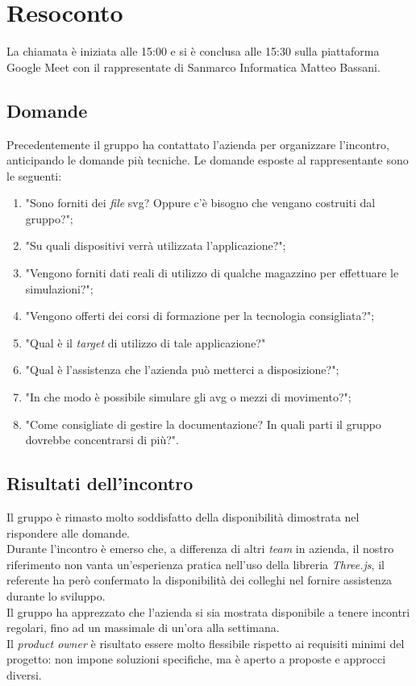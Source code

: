 \section{Resoconto}
La chiamata è iniziata alle 15:00 e si è conclusa alle 15:30 sulla piattaforma Google Meet con il rappresentate di Sanmarco Informatica Matteo Bassani.
\subsection{Domande}
Precedentemente il gruppo ha contattato l'azienda per organizzare l'incontro, anticipando le domande più tecniche.
Le domande esposte al rappresentante sono le seguenti:
\begin{enumerate}
    \item "Sono forniti dei \textit{file} svg? Oppure c'è bisogno che vengano costruiti dal gruppo?";
    \item "Su quali dispositivi verrà utilizzata l'applicazione?";
    \item "Vengono forniti dati reali di utilizzo di qualche magazzino per effettuare le simulazioni?";
    \item "Vengono offerti dei corsi di formazione per la tecnologia consigliata?";
	\item "Qual è il \textit{target} di utilizzo di tale applicazione?"
    \item "Qual è l'assistenza che l'azienda può metterci a disposizione?";
    \item "In che modo è possibile simulare gli avg o mezzi di movimento?";
    \item "Come consigliate di gestire la documentazione? In quali parti il gruppo dovrebbe concentrarsi di più?".
\end{enumerate}

\subsection{Risultati dell'incontro}
Il gruppo è rimasto molto soddisfatto della disponibilità dimostrata nel rispondere alle domande. \\ 
Durante l'incontro è emerso che, a differenza di altri \textit{team} in azienda, il nostro riferimento non vanta un'esperienza pratica nell'uso della libreria \textit{Three.js}, il referente ha però confermato la disponibilità dei colleghi nel fornire assistenza durante lo sviluppo. \\
Il gruppo ha apprezzato che l'azienda si sia mostrata disponibile a tenere incontri regolari, fino ad un massimale di un'ora alla settimana. \\
Il \textit{product owner} è risultato essere molto flessibile rispetto ai requisiti minimi del progetto: non impone soluzioni specifiche, ma è aperto a proposte e approcci diversi. \\

